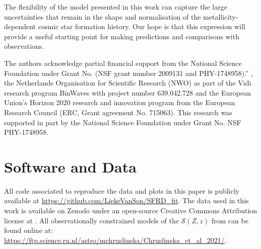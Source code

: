 \documentclass[linenumbers,twocolumn]{aastex631}
\newcommand{\SFRDzZ}{\ensuremath{\mathcal{S}(Z,z)}\xspace}
\begin{document}
The flexibility of the model presented in this work can capture the large uncertainties that remain in the shape and normalisation of the metallicity-dependent cosmic star formation history. 
Our hope is that this expression will provide a useful starting point for making predictions and comparisons with observations.


\begin{acknowledgments}
The authors acknowledge partial financial support from the  National Science Foundation under Grant No. (NSF grant number 2009131  and PHY-1748958).”
, the Netherlands Organisation for Scientific Research (NWO) as part of the Vidi research program BinWaves with project number 639.042.728 and the European Union’s Horizon 2020 research and innovation program from the European Research Council (ERC, Grant agreement No. 715063). 
This research was supported in part by the National Science Foundation under Grant No. NSF PHY-1748958. %
\end{acknowledgments}




\section*{Software and Data}
All code associated to reproduce the data and plots in this paper is publicly available at \url{https://github.com/LiekeVanSon/SFRD_fit}.
The data used in this work is available on Zenodo under an open-source Creative Commons Attribution license at .
All observationally constrained models of the \SFRDzZ from \cite{Chruslinska+2021} can be found online at: \url{https://ftp.science.ru.nl/astro/mchruslinska/Chruslinska_et_al_2021/}.
\end{document}
